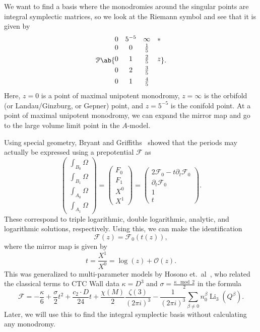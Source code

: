 \documentclass[10pt]{amsart}
\theoremstyle{definition}
\theoremstyle{remark}
\theoremstyle{plain}
\theoremstyle{definition}
\theoremstyle{remark}
\newcommand{\mc}[1]{\mathcal{#1}}
\newcommand{\on}[1]{\operatorname{#1}}
\newcommand{\1}{\mathbf{1}}
\newcommand{\2}{\mathbf{2}}
\newcommand{\3}{\mathbf{3}}
\begin{document}
We want to find a basis where the monodromies around the singular points are integral symplectic matrices, so we look at the Riemann symbol and see that it is given by
\[ \mc{P}\ab\{ \begin{matrix}
    0 & 5^{-5} & \infty & * \\
    0 & 0 & \frac{1}{5} \\
    \\[-0.8em]
    0 & 1 & \frac{2}{5} & z \\
    \\[-0.8em]
    0 & 2 & \frac{3}{5} \\
    \\[-0.8em]
    0 & 1 & \frac{4}{5}
\end{matrix}
\}.\]
Here, $z=0$ is a point of maximal unipotent monodromy, $z=\infty$ is the orbifold (or Landau/Ginzburg, or Gepner) point, and $z=5^{-5}$ is the conifold point. At a point of maximal unipotent monodromy, we can expand the mirror map and go to the large volume limit point in the $A$-model.

Using special geometry, Bryant and Griffiths~\cite{bryantgriffiths} showed that the periods may actually be expressed using a prepotential $\mc{F}$ as
\[ \begin{pmatrix}
    \int_{B_0} \Omega \\
    \int_{B_1} \Omega \\
    \int_{A_0} \Omega \\
    \int_{A_1} \Omega
\end{pmatrix} = \begin{pmatrix}
    F_0 \\
    F_1 \\
    X^0 \\
    X^1 
\end{pmatrix} = \begin{pmatrix}
    2 \mc{F}_0 - t \partial_t \mc{F}_0 \\
    \partial_t \mc{F}_0 \\
    1 \\ 
    t
\end{pmatrix}.
\]
These correspond to triple logarithmic, double logarithmic, analytic, and logarithmic solutions, respectively. Using this, we can make the identification
\[ \mc{F}(z) = \mc{F}_0(t(z)), \]
where the mirror map is given by
\[ t = \frac{X^1}{X^0} = \log(z) + \mc{O}(z). \]
This was generalized to multi-parameter models by Hosono et.~al~\cite{mirrormultiparam}, who related the classical terms to CTC Wall data $\kappa = D^3$ and $\sigma = \frac{\kappa \mod{2}}{2}$ in the formula
\[ \mc{F} = - \frac{\kappa}{6} + \frac{\sigma}{2}t^2 + \frac{c_2 \cdot D}{24}t + \frac{\chi(M)}{2} \frac{\zeta(3)}{(2\pi i)^3} - \frac{1}{(2\pi i)^3}\sum_{\beta \neq 0} n_0^{\beta} \on{Li}_3(Q^{\beta}). \]
Later, we will use this to find the integral symplectic basis without calculating any monodromy.
\end{document}
